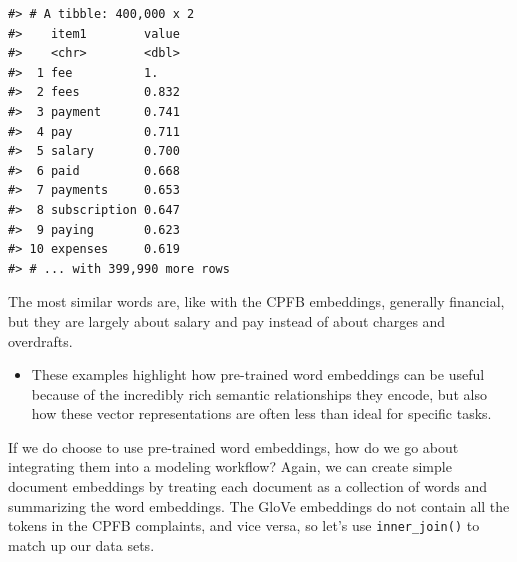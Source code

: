 \documentclass[
]{krantz}
\newenvironment{rmdblock}[1]
  {\begin{shaded*}
  \begin{itemize}[left = -1cm, labelsep = 1cm]
  \renewcommand{\labelitemi}{
    \raisebox{-.7\height}[0pt][0pt]{
      {\setkeys{Gin}{width=3em,keepaspectratio}\texttt{[image: images/\#1]}}
    }
  }
 
  \item
  }
  {
  \end{itemize}
  \end{shaded*}
  }
\newenvironment{rmdnote}
  {\begin{rmdblock}{note}}
  {\end{rmdblock}}
\begin{document}
\begin{verbatim}
#> # A tibble: 400,000 x 2
#>    item1        value
#>    <chr>        <dbl>
#>  1 fee          1.   
#>  2 fees         0.832
#>  3 payment      0.741
#>  4 pay          0.711
#>  5 salary       0.700
#>  6 paid         0.668
#>  7 payments     0.653
#>  8 subscription 0.647
#>  9 paying       0.623
#> 10 expenses     0.619
#> # ... with 399,990 more rows
\end{verbatim}

The most similar words are, like with the CPFB embeddings, generally financial, but they are largely about salary and pay instead of about charges and overdrafts.


\begin{rmdnote}
These examples highlight how pre-trained word embeddings can be useful
because of the incredibly rich semantic relationships they encode, but
also how these vector representations are often less than ideal for
specific tasks.
\end{rmdnote}

If we do choose to use pre-trained word embeddings, how do we go about integrating them into a modeling workflow? Again, we can create simple document embeddings by treating each document as a collection of words and summarizing the word embeddings. The GloVe embeddings do not contain all the tokens in the CPFB complaints, and vice versa, so let's use \texttt{inner\_join()} to match up our data sets.
\end{document}
